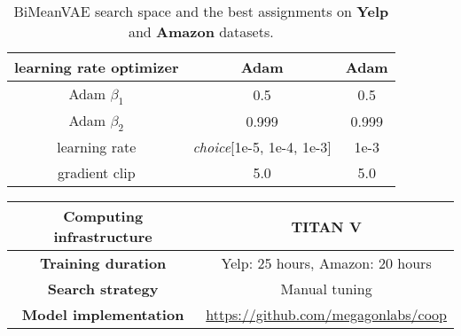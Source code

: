 \documentclass[11pt]{article}
\newcommand{\name}{\mbox{\sc BiMeanVAE}}
\newcommand{\yelp}{\mbox{\bf Yelp}}
\newcommand{\amazon}{\mbox{\bf Amazon}}
\begin{document}
\begin{table*}[ht]
\begin{tabular}{ccc}
    \midrule
    learning rate optimizer & Adam & Adam\\
    \midrule
    Adam $\beta_1$ & 0.5 & 0.5\\
    \midrule
    Adam $\beta_2$ & 0.999 & 0.999\\
    \midrule
    learning rate & \emph{choice}[1e-5, 1e-4, 1e-3] & 1e-3 \\
    \midrule
    gradient clip & 5.0 & 5.0 \\
    \bottomrule
    \end{tabular}
    \caption{\name{} search space and the best assignments on \yelp{} and \amazon{} datasets.}
    \label{tab:bimeanvae_param}
\end{table*}

\begin{table*}[ht]
    \centering
    \small
    \begin{tabular}{cc}
        \toprule
       \textbf{Computing infrastructure} & TITAN V\\
       \midrule
       \textbf{Training duration} & Yelp: 25 hours, Amazon: 20 hours\\
       \midrule
       \textbf{Search strategy} & Manual tuning \\\midrule
       \textbf{Model implementation} & \url{https://github.com/megagonlabs/coop}\\
       \bottomrule
    \end{tabular}


\end{table*}
\end{document}
